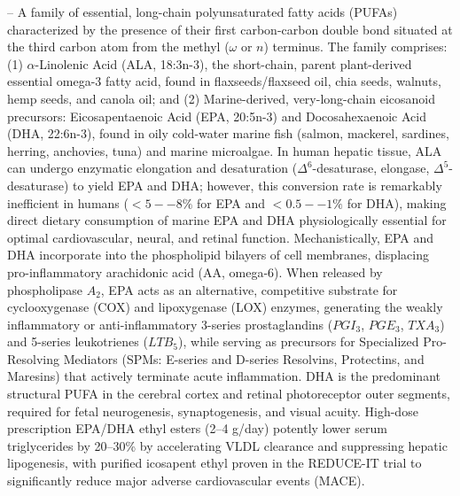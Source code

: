 -- A family of essential, long-chain polyunsaturated fatty acids (PUFAs) characterized by the presence of their first carbon-carbon double bond situated at the third carbon atom from the methyl ($\omega$ or $n$) terminus. The family comprises: (1) $\alpha$-Linolenic Acid (ALA, 18:3n-3), the short-chain, parent plant-derived essential omega-3 fatty acid, found in flaxseeds/flaxseed oil, chia seeds, walnuts, hemp seeds, and canola oil; and (2) Marine-derived, very-long-chain eicosanoid precursors: Eicosapentaenoic Acid (EPA, 20:5n-3) and Docosahexaenoic Acid (DHA, 22:6n-3), found in oily cold-water marine fish (salmon, mackerel, sardines, herring, anchovies, tuna) and marine microalgae. In human hepatic tissue, ALA can undergo enzymatic elongation and desaturation ($\Delta^6$-desaturase, elongase, $\Delta^5$-desaturase) to yield EPA and DHA; however, this conversion rate is remarkably inefficient in humans ($<5--8\%$ for EPA and $<0.5--1\%$ for DHA), making direct dietary consumption of marine EPA and DHA physiologically essential for optimal cardiovascular, neural, and retinal function. Mechanistically, EPA and DHA incorporate into the phospholipid bilayers of cell membranes, displacing pro-inflammatory arachidonic acid (AA, omega-6). When released by phospholipase $A_2$, EPA acts as an alternative, competitive substrate for cyclooxygenase (COX) and lipoxygenase (LOX) enzymes, generating the weakly inflammatory or anti-inflammatory 3-series prostaglandins ($PGI_3$, $PGE_3$, $TXA_3$) and 5-series leukotrienes ($LTB_5$), while serving as precursors for Specialized Pro-Resolving Mediators (SPMs: E-series and D-series Resolvins, Protectins, and Maresins) that actively terminate acute inflammation. DHA is the predominant structural PUFA in the cerebral cortex and retinal photoreceptor outer segments, required for fetal neurogenesis, synaptogenesis, and visual acuity. High-dose prescription EPA/DHA ethyl esters (2--4 g/day) potently lower serum triglycerides by 20--30\% by accelerating VLDL clearance and suppressing hepatic lipogenesis, with purified icosapent ethyl proven in the REDUCE-IT trial to significantly reduce major adverse cardiovascular events (MACE).

